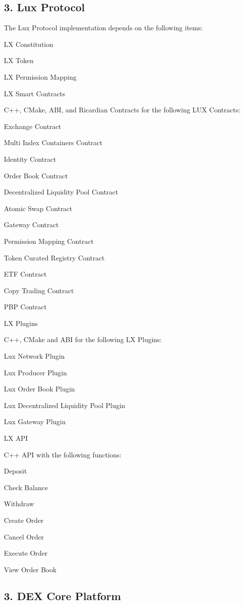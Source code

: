 \documentclass[11pt]{article}
\begin{document}
\subsection{3. Lux Protocol}

The Lux Protocol implementation depends on the following items:


LX Constitution


LX Token


LX Permission Mapping


LX Smart Contracts


C++, CMake, ABI, and Ricardian Contracts for the following LUX Contracts:


Exchange Contract


Multi Index Containers Contract


Identity Contract


Order Book Contract


Decentralized Liquidity Pool Contract


Atomic Swap Contract


Gateway Contract


Permission Mapping Contract


Token Curated Registry Contract


ETF Contract


Copy Trading Contract


PBP Contract


LX Plugins


C++, CMake and ABI for the following LX Plugins:


Lux Network Plugin


Lux Producer Plugin


Lux Order Book Plugin


Lux Decentralized Liquidity Pool Plugin


Lux Gateway Plugin


LX API


C++ API with the following functions:


Deposit


Check Balance


Withdraw


Create Order


Cancel Order


Execute Order


View Order Book


\subsection{3. DEX Core Platform}
\end{document}
